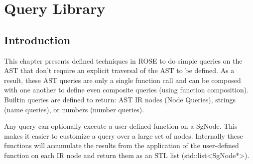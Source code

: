 \chapter{Query Library}

\label{QueryLibrary:QueryLibrary}



\section{Introduction}

   This chapter presents defined techniques in ROSE to do simple queries on the AST that
don't require an explicit traversal of the AST to be defined.  As a result, these AST
queries are only a single function call and can be composed with one another to define
even composite queries (using function composition).  Builtin queries are defined
to return: AST IR nodes (Node Queries), strings (name queries), or numbers (number 
queries).

Any query can optionally execute a user-defined function on a SgNode. This makes
it easier to customize a query over a large set of nodes.
Internally these functions will accumulate the results from the application 
of the user-defined function on each IR node and return them as an STL list
(std::list<SgNode*>).

